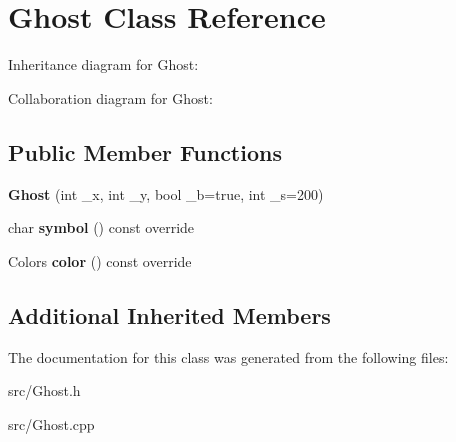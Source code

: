\hypertarget{class_ghost}{}\section{Ghost Class Reference}
\label{class_ghost}


Inheritance diagram for Ghost\+:


Collaboration diagram for Ghost\+:
\subsection*{Public Member Functions}
\begin{DoxyCompactItemize}
\item 
\mbox{\label{class_ghost_a883625d24ece1733f22815557d3e4264}} 
{\bfseries Ghost} (int \+\_\+x, int \+\_\+y, bool \+\_\+b=true, int \+\_\+s=200)
\item 
\mbox{\label{class_ghost_ab120c617cd359527430251e2e65eab5f}} 
char {\bfseries symbol} () const override
\item 
\mbox{\label{class_ghost_a6bcd1b63f1753b5cb89fe0d868e8cba7}} 
Colors {\bfseries color} () const override
\end{DoxyCompactItemize}
\subsection*{Additional Inherited Members}


The documentation for this class was generated from the following files\+:\begin{DoxyCompactItemize}
\item 
src/Ghost.\+h\item 
src/Ghost.\+cpp\end{DoxyCompactItemize}
